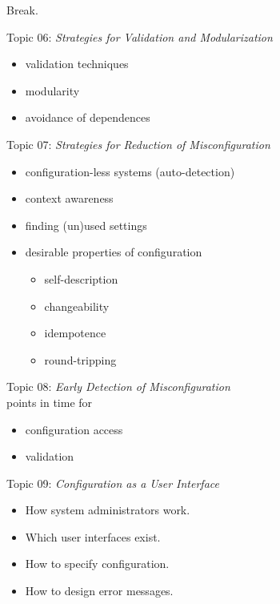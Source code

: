 \begin{assignment}
	\begin{task}
	Break.
	\end{task}
\end{assignment}

\begin{frame}
	Topic 06: \textit{Strategies for Validation and Modularization}
	\begin{itemize}
		\item validation techniques
		\item modularity
		\item avoidance of dependences
	\end{itemize}
\end{frame}

\begin{frame}
	Topic 07: \textit{Strategies for Reduction of Misconfiguration}
	\begin{itemize}
		\item configuration-less systems (auto-detection)
		\item context awareness
		\item finding (un)used settings
		\item desirable properties of configuration
		\begin{itemize}
			\item self-description
			\item changeability
			\item idempotence
			\item round-tripping
		\end{itemize}
	\end{itemize}
\end{frame}

\begin{frame}
	Topic 08: \textit{Early Detection of Misconfiguration}
	\\ \vspace{1cm}
	points in time for
	\begin{itemize}
		\item configuration access
		\item validation
	\end{itemize}
\end{frame}

\begin{frame}
	Topic 09: \textit{Configuration as a User Interface}
	\begin{itemize}
		\item How system administrators work.
		\item Which user interfaces exist.
		\item How to specify configuration.
		\item How to design error messages.
	\end{itemize}
\end{frame}

